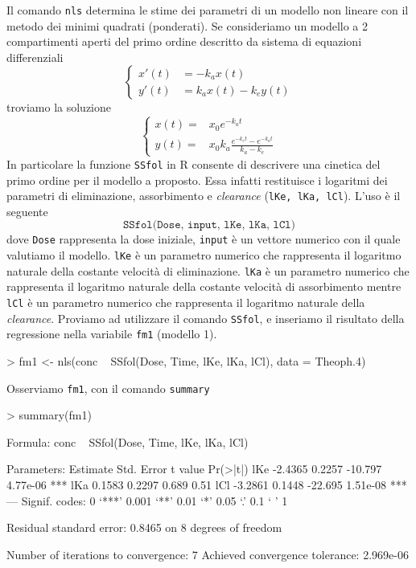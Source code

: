 \documentclass[onecolumn,11pt]{book}
\begin{document}
Il comando \texttt{nls} determina le stime dei parametri di un modello non lineare con il metodo dei minimi quadrati (ponderati).
Se consideriamo un modello a 2 compartimenti aperti del primo ordine descritto da sistema di equazioni differenziali
\begin{equation}\begin{cases}
x'(t)&= -k_a x(t)\\
y'(t)&= k_a x(t)-k_e y(t)
\end{cases}
\end{equation}
troviamo la soluzione
\begin{equation}
\begin{cases}
x(t)=&x_0 e^{-k_a t}\\
y(t) =&x_0 k_a  \frac{e^{-k_e t} - e^{-k_a t}}{k_a-k_e}
\end{cases}
 \end{equation}
In particolare la funzione \texttt{SSfol} in \textsf{R} consente di descrivere una cinetica del primo ordine per il modello a proposto. Essa infatti restituisce i logaritmi dei parametri di eliminazione, assorbimento e  \emph{clearance} (\texttt{lKe, lKa, lCl}).
L'uso \`e il seguente
\begin{equation*}\texttt{SSfol(Dose, input, lKe, lKa, lCl})  
\end{equation*}
dove \texttt{Dose}  rappresenta la dose iniziale,  \texttt{input} \`e un vettore numerico con il quale valutiamo il modello. \texttt{lKe} \`e un parametro numerico che rappresenta il logaritmo naturale della costante velocit\`a di eliminazione. \texttt{lKa} \`e un parametro numerico che rappresenta il logaritmo naturale della costante velocit\`a di assorbimento mentre  \texttt{lCl} \`e un parametro numerico che rappresenta il logaritmo naturale  della \emph{clearance}. 
Proviamo ad utilizzare il comando \texttt{SSfol}, e inseriamo il risultato della regressione nella variabile \texttt{fm1} (modello 1).
\begin{Schunk}
\begin{Sinput}
> fm1 <- nls(conc ~ SSfol(Dose, Time, lKe, lKa, lCl), data = Theoph.4)
\end{Sinput}
\end{Schunk}
Osserviamo \texttt{fm1},  con il comando \texttt{summary}  
\begin{Schunk}
\begin{Sinput}
> summary(fm1)
\end{Sinput}
\begin{Soutput}
Formula: conc ~ SSfol(Dose, Time, lKe, lKa, lCl)

Parameters:
    Estimate Std. Error t value Pr(>|t|)    
lKe  -2.4365     0.2257 -10.797 4.77e-06 ***
lKa   0.1583     0.2297   0.689     0.51    
lCl  -3.2861     0.1448 -22.695 1.51e-08 ***
---
Signif. codes:  
0 ‘***’ 0.001 ‘**’ 0.01 ‘*’ 0.05 ‘.’ 0.1 ‘ ’ 1

Residual standard error: 0.8465 on 8 degrees of freedom

Number of iterations to convergence: 7 
Achieved convergence tolerance: 2.969e-06
\end{Soutput}
\end{Schunk}
\end{document}

